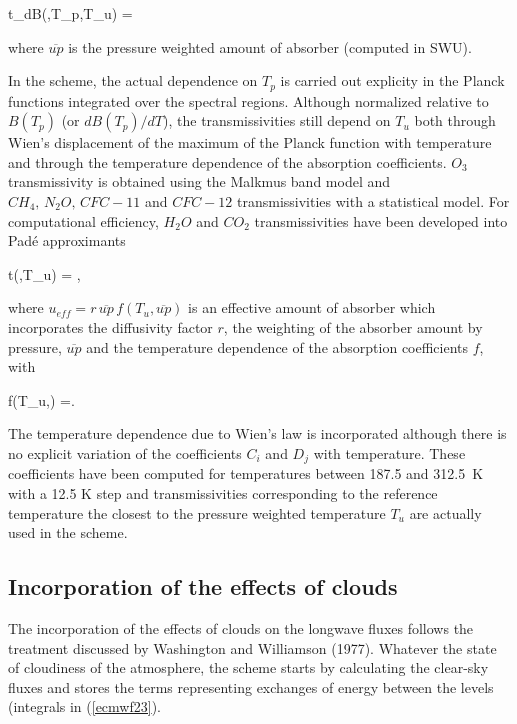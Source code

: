 \medskip
\be
t_{dB}(,T_p,T_u) = 
\label{ecmwf26b}
\ee
\medskip

\noindent where $\overline{up}$ is the pressure weighted amount of absorber (computed in SWU).


In the scheme, the actual dependence on $T_p$ is carried out explicity in the Planck functions integrated over the spectral regions. Although normalized relative to $B(T_p)$ (or $dB(T_p)/dT$), the transmissivities still depend on $T_u$ both through Wien's displacement of the maximum of the Planck function with temperature and through the temperature dependence of the absorption coefficients.
$O_3$ transmissivity is obtained using the Malkmus band model and $CH_4,\,N_2O,\,CFC-11$ and $CFC-12$ transmissivities with a statistical model. 
For computational efficiency, $H_2O$ and $CO_2$ transmissivities have been developed into Pad\'e approximants


\medskip
\be
t(,T_u) = ,
\label{ecmwf27}
\ee
\medskip

\noindent where $u_{eff} = r \, \overline{up} \, f(T_u,\overline{up})$ is an effective amount of absorber which incorporates the diffusivity factor $r$, the weighting of the absorber amount by pressure, $\overline{up}$ and the temperature dependence of the absorption coefficients $f$, with

\medskip
\be
f(T_u,) =.
\label{ecmwf28}
\ee
\medskip

The temperature dependence due to Wien's law is incorporated although there is no explicit variation of the coefficients $C_i$ and $D_j$ with temperature. These coefficients have been computed for temperatures between 187.5 and 312.5~K with a 12.5 K step and transmissivities corresponding to the reference temperature the closest to the pressure weighted temperature $T_u$ are actually used in the scheme.

%
\subsection{Incorporation of the effects of clouds}
%

The incorporation of the effects of clouds on the longwave fluxes follows the treatment discussed by Washington and Williamson (1977). Whatever the state of cloudiness of the atmosphere, the scheme starts by calculating the clear-sky fluxes and stores the terms representing exchanges of energy between the levels (integrals in (\ref{ecmwf23}).


